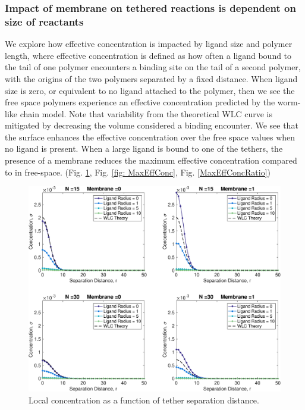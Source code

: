\documentclass[../../AdvancementSummary.tex]{subfiles}
\begin{document}
       


\subsubsection{Impact of membrane on tethered reactions is dependent on size of reactants}

We explore how effective concentration is impacted by ligand size and polymer length, where effective concentration is defined as how often a ligand bound to the tail of one polymer encounters a binding site on the tail of a second polymer, with the origins of the two polymers separated by a fixed distance. When ligand size is zero, or equivalent to no ligand attached to the polymer, then we see the free space polymers experience an effective concentration predicted by the worm-like chain model. Note that variability from the theoretical WLC curve is mitigated by decreasing the volume considered a binding encounter. We see that the surface enhances the effective concentration over the free space values when no ligand is present. When a large ligand is bound to one of the tethers, the presence of a membrane reduces the maximum effective concentration compared to in free-space. (Fig. \ref{fig: ConcVSSeparation}, Fig. \ref{fig: MaxEffConc}, Fig. \ref{MaxEffConcRatio})

\begin{figure}[H]
    \begin{center}
        		\includegraphics[width=0.8\linewidth]{ResultsFigures/EffectiveConcentrationKernel/ConcentrationVSSeparation.eps}
        \caption{Local concentration as a function of tether separation distance. \label{fig: ConcVSSeparation}}
    \end{center}
\end{figure}
\end{document}
